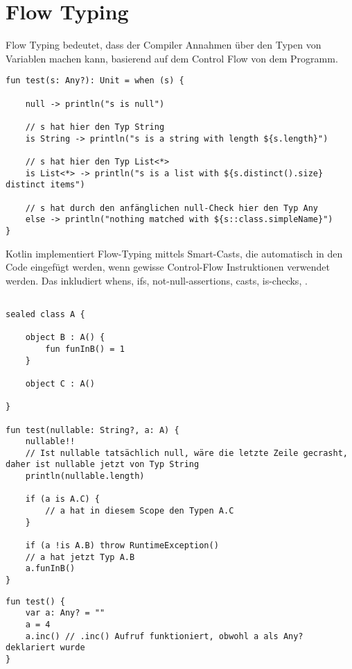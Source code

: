 
\section{Flow Typing}\label{sec:flow-typing}

\renewcommand{\kapitelautor}{Autor: Marvin Kurka}

Flow Typing bedeutet, dass der Compiler Annahmen über den Typen von Variablen machen kann, basierend auf dem Control
Flow von dem Programm.

\begin{verbatim}
fun test(s: Any?): Unit = when (s) {

    null -> println("s is null")

    // s hat hier den Typ String
    is String -> println("s is a string with length ${s.length}")

    // s hat hier den Typ List<*>
    is List<*> -> println("s is a list with ${s.distinct().size} distinct items")

    // s hat durch den anfänglichen null-Check hier den Typ Any
    else -> println("nothing matched with ${s::class.simpleName}")
}
\end{verbatim}

Kotlin implementiert Flow-Typing mittels Smart-Casts, die automatisch in den Code eingefügt werden, wenn gewisse
Control-Flow Instruktionen verwendet werden.
Das inkludiert \zB whens, ifs, not-null-assertions, casts, is-checks, \usw.

\begin{verbatim}

sealed class A {

    object B : A() {
        fun funInB() = 1
    }

    object C : A()

}

fun test(nullable: String?, a: A) {
    nullable!!
    // Ist nullable tatsächlich null, wäre die letzte Zeile gecrasht, daher ist nullable jetzt von Typ String
    println(nullable.length)

    if (a is A.C) {
        // a hat in diesem Scope den Typen A.C
    }

    if (a !is A.B) throw RuntimeException()
    // a hat jetzt Typ A.B
    a.funInB()
}
\end{verbatim}

\begin{verbatim}
fun test() {
    var a: Any? = ""
    a = 4
    a.inc() // .inc() Aufruf funktioniert, obwohl a als Any? deklariert wurde
}
\end{verbatim}

